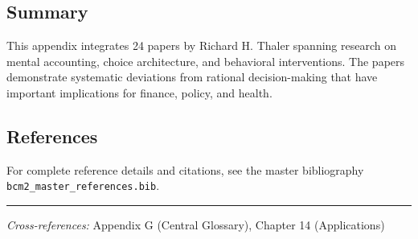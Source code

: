\subsection{Summary}

This appendix integrates 24 papers by Richard H. Thaler
spanning research on mental accounting, choice architecture, and behavioral
interventions. The papers demonstrate systematic deviations from rational
decision-making that have important implications for finance, policy, and health.

\subsection{References}

For complete reference details and citations, see the master bibliography
\texttt{bcm2\_master\_references.bib}.

\vspace{1em}
\hrule
\vspace{0.5em}

\noindent\textit{Cross-references:}
Appendix G (Central Glossary), Chapter 14 (Applications)
